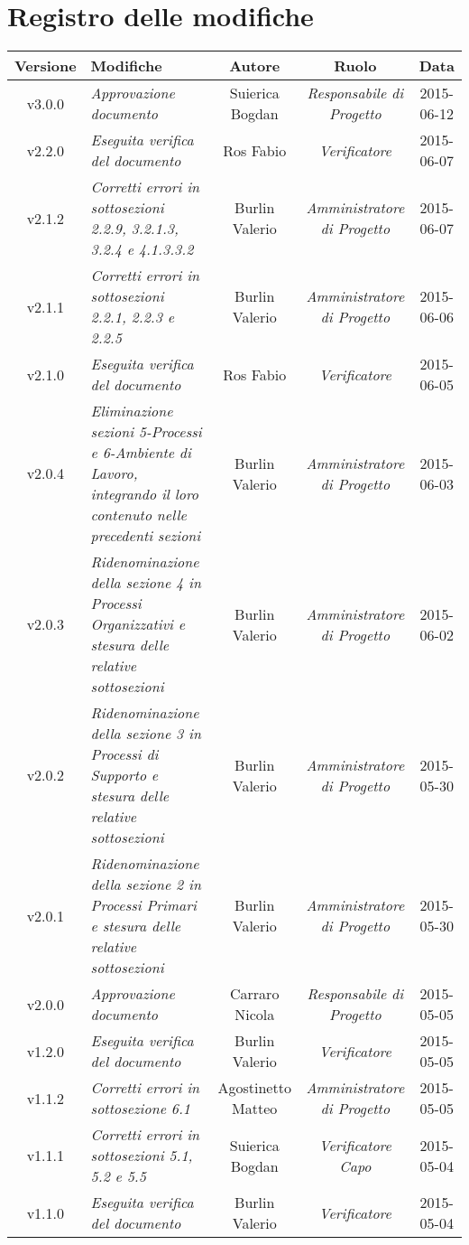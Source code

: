 \newpage
\section*{Registro delle modifiche}

\begin{table}[h]
\centering
\begin{tabular}{|c|p{}|c|c|c|}
	\toprule
		\textbf{Versione} & \textbf{Modifiche} & \textbf{Autore} & \textbf{Ruolo} & \textbf{Data} \\
	\midrule
	\midrule
		v3.0.0 & \textit{Approvazione documento} & Suierica Bogdan & \textit{Responsabile di Progetto} & 2015-06-12\\
	\midrule
		v2.2.0 & \textit{Eseguita verifica del documento} & Ros Fabio & \textit{Verificatore} & 2015-06-07\\
	\midrule
		v2.1.2 & \textit{Corretti errori in sottosezioni 2.2.9, 3.2.1.3, 3.2.4 e 4.1.3.3.2} & Burlin Valerio & \textit{Amministratore di Progetto} & 2015-06-07\\
	\midrule
		v2.1.1 & \textit{Corretti errori in sottosezioni 2.2.1, 2.2.3 e 2.2.5} & Burlin Valerio & \textit{Amministratore di Progetto} & 2015-06-06\\
	\midrule
		v2.1.0 & \textit{Eseguita verifica del documento} & Ros Fabio & \textit{Verificatore} & 2015-06-05\\
	\midrule
		v2.0.4 & \textit{Eliminazione sezioni 5-Processi e 6-Ambiente di Lavoro, integrando il loro contenuto nelle precedenti sezioni} & Burlin Valerio & \textit{Amministratore di Progetto} & 2015-06-03\\
	\midrule
		v2.0.3 & \textit{Ridenominazione della sezione 4 in Processi Organizzativi e stesura delle relative sottosezioni} & Burlin Valerio & \textit{Amministratore di Progetto} & 2015-06-02\\
	\midrule
		v2.0.2 & \textit{Ridenominazione della sezione 3 in Processi di Supporto e stesura delle relative sottosezioni} & Burlin Valerio & \textit{Amministratore di Progetto} & 2015-05-30\\
	\midrule
		v2.0.1 & \textit{Ridenominazione della sezione 2 in Processi Primari e stesura delle relative sottosezioni} & Burlin Valerio & \textit{Amministratore di Progetto} & 2015-05-30\\
	\midrule
		v2.0.0 & \textit{Approvazione documento} & Carraro Nicola & \textit{Responsabile di Progetto} & 2015-05-05\\
	\midrule
		v1.2.0 & \textit{Eseguita verifica del documento} & Burlin Valerio & \textit{Verificatore} & 2015-05-05\\
	\midrule
		v1.1.2 & \textit{Corretti errori in sottosezione 6.1} & Agostinetto Matteo & \textit{Amministratore di Progetto} & 2015-05-05\\
	\midrule
		v1.1.1 & \textit{Corretti errori in sottosezioni 5.1, 5.2 e 5.5} & Suierica Bogdan & \textit{Verificatore Capo} & 2015-05-04\\
	\midrule
		v1.1.0 & \textit{Eseguita verifica del documento} & Burlin Valerio & \textit{Verificatore} & 2015-05-04\\
	\bottomrule
\end{tabular}
\end{table}
